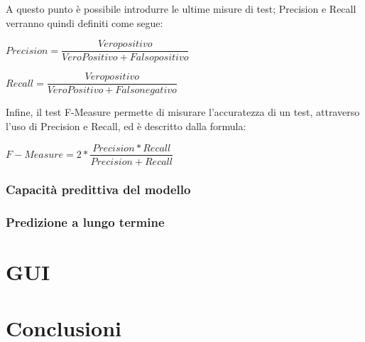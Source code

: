 \documentclass[10pt,a4paper]{article}
\begin{document}
	A questo punto è possibile introdurre le ultime misure di test; Precision e Recall verranno quindi definiti come segue:
	
	\begin{center}
		$ Precision = \dfrac{Veropositivo}{VeroPositivo + Falsopositivo} $
	\end{center}

	\begin{center}
		$ Recall = \dfrac{Veropositivo}{VeroPositivo + Falsonegativo} $
	\end{center}

	Infine, il test F-Measure permette di misurare l'accuratezza di un test, attraverso l'uso di Precision e Recall, ed è descritto dalla formula:
	
		\begin{center}
		$ F-Measure = 2 * \dfrac{Precision * Recall}{Precision + Recall} $
	\end{center}
	
	
	
	\subsubsection{Capacità predittiva del modello}
	
	
	\subsubsection{Predizione a lungo termine}
	
	
	
	\section{GUI}
	
	\section{Conclusioni}
\end{document}
